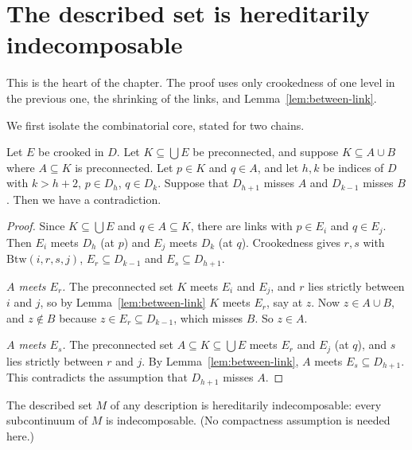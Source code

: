 \section{The described set is hereditarily indecomposable}

This is the heart of the chapter. The proof uses only crookedness of one level in the
previous one, the shrinking of the links, and Lemma~\ref{lem:between-link}.

We first isolate the combinatorial core, stated for two chains.

\begin{lemma}\label{lem:core}
Let $E$ be crooked in $D$. Let $K\subseteq\bigcup E$ be preconnected, and suppose $K\subseteq A\cup
B$ where $A\subseteq K$ is preconnected. Let $p\in K$ and $q\in A$, and let $h,k$ be indices of
$D$ with $k>h+2$, $p\in D_h$, $q\in D_k$. Suppose that $D_{h+1}$ misses $A$ and $D_{k-1}$ misses
$B$. Then we have a contradiction.
\end{lemma}

\begin{proof}
Since $K\subseteq\bigcup E$ and $q\in A\subseteq K$, there are links with $p\in E_i$ and $q\in E_j$.
Then $E_i$ meets $D_h$ (at $p$) and $E_j$ meets $D_k$ (at $q$). Crookedness gives $r,s$ with
$\mathrm{Btw}(i,r,s,j)$, $E_r\subseteq D_{k-1}$ and $E_s\subseteq D_{h+1}$.

\emph{$A$ meets $E_r$.} The preconnected set $K$ meets $E_i$ and $E_j$, and $r$ lies strictly
between $i$ and $j$, so by Lemma~\ref{lem:between-link} $K$ meets $E_r$, say at $z$. Now
$z\in A\cup B$, and $z\notin B$ because $z\in E_r\subseteq D_{k-1}$, which misses $B$. So $z\in A$.

\emph{$A$ meets $E_s$.} The preconnected set $A\subseteq K\subseteq\bigcup E$ meets $E_r$ and $E_j$
(at $q$), and $s$ lies strictly between $r$ and $j$. By Lemma~\ref{lem:between-link}, $A$
meets $E_s\subseteq D_{h+1}$. This contradicts the assumption that $D_{h+1}$ misses $A$.
\end{proof}


\begin{theorem}[Bing]\label{thm:HI}
The described set $M$ of any description is hereditarily indecomposable: every subcontinuum of
$M$ is indecomposable. (No compactness assumption is needed here.)
\end{theorem}

